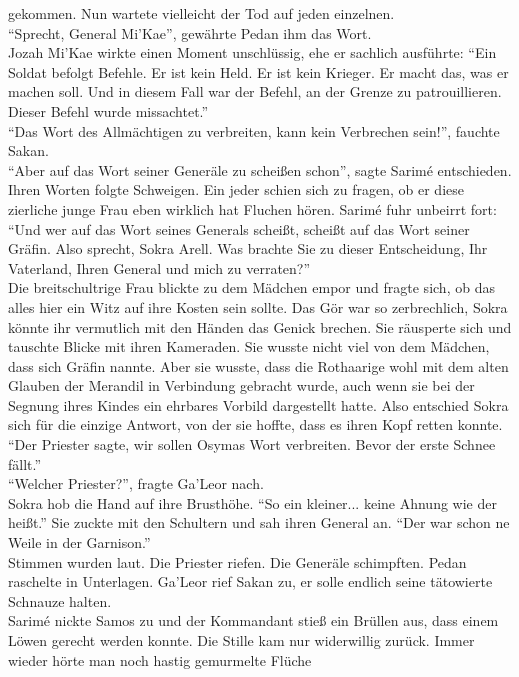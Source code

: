 gekommen. Nun wartete vielleicht der Tod auf jeden einzelnen.\\
``Sprecht, General Mi'Kae'', gewährte Pedan ihm das Wort.\\
Jozah Mi'Kae wirkte einen Moment unschlüssig, ehe er sachlich ausführte: ``Ein Soldat befolgt 
Befehle. Er ist kein Held. Er ist kein Krieger. Er macht das, was er machen soll. Und in diesem 
Fall war der Befehl, an der Grenze zu patrouillieren. Dieser Befehl wurde missachtet.''\\
``Das Wort des Allmächtigen zu verbreiten, kann kein Verbrechen sein!'', fauchte Sakan.\\
``Aber auf das Wort seiner Generäle zu scheißen schon'', sagte Sarimé entschieden.\\
Ihren Worten folgte Schweigen. Ein jeder schien sich zu fragen, ob er diese zierliche junge Frau 
eben wirklich hat Fluchen hören. Sarimé fuhr unbeirrt fort: ``Und wer auf das Wort seines Generals 
scheißt, scheißt auf das Wort seiner Gräfin. Also sprecht, Sokra Arell. Was brachte Sie zu dieser 
Entscheidung, Ihr Vaterland, Ihren General und mich zu verraten?''\\
Die breitschultrige Frau blickte zu dem Mädchen empor und fragte sich, ob das alles hier ein Witz 
auf ihre Kosten sein sollte. Das Gör war so zerbrechlich, Sokra könnte ihr vermutlich mit den 
Händen das Genick brechen. Sie räusperte sich und tauschte Blicke mit ihren Kameraden. Sie wusste 
nicht viel von dem Mädchen, dass sich Gräfin nannte. Aber sie wusste, dass die Rothaarige wohl 
mit dem alten Glauben der Merandil in Verbindung gebracht wurde, auch wenn sie bei der Segnung 
ihres Kindes ein ehrbares Vorbild dargestellt hatte. Also entschied Sokra sich für die einzige 
Antwort, von der sie hoffte, dass es ihren Kopf retten konnte. ``Der Priester sagte, wir sollen 
Osymas Wort verbreiten. Bevor der erste Schnee fällt.''\\
``Welcher Priester?'', fragte Ga'Leor nach.\\
Sokra hob die Hand auf ihre Brusthöhe. ``So ein kleiner... keine Ahnung wie der heißt.'' Sie zuckte 
mit den Schultern und sah ihren General an. ``Der war schon ne Weile in der Garnison.''\\
Stimmen wurden laut. Die Priester riefen. Die Generäle schimpften. Pedan raschelte in Unterlagen. 
Ga'Leor rief Sakan zu, er solle endlich seine tätowierte Schnauze halten.\\
Sarimé nickte Samos zu und der Kommandant stieß ein Brüllen aus, dass einem Löwen gerecht werden 
konnte. Die Stille kam nur widerwillig zurück. Immer wieder hörte man noch hastig gemurmelte Flüche 
